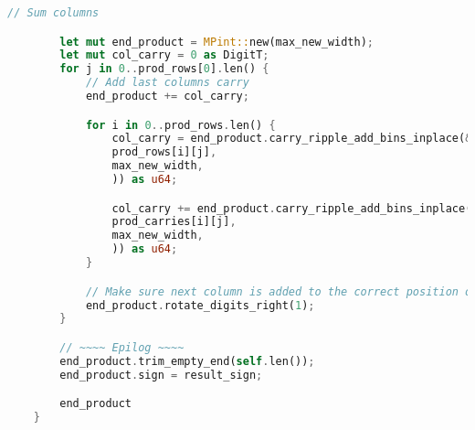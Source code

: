 \begin{lstlisting}[language=Rust, style=boxed]
        // Sum columns

        let mut end_product = MPint::new(max_new_width);
        let mut col_carry = 0 as DigitT;
        for j in 0..prod_rows[0].len() {
            // Add last columns carry
            end_product += col_carry;

            for i in 0..prod_rows.len() {
                col_carry = end_product.carry_ripple_add_bins_inplace(&MPint::from_digit(
                prod_rows[i][j],
                max_new_width,
                )) as u64;

                col_carry += end_product.carry_ripple_add_bins_inplace(&MPint::from_digit(
                prod_carries[i][j],
                max_new_width,
                )) as u64;
            }

            // Make sure next column is added to the correct position of the number system
            end_product.rotate_digits_right(1);
        }

        // ~~~~ Epilog ~~~~
        end_product.trim_empty_end(self.len());
        end_product.sign = result_sign;

        end_product
    }
\end{lstlisting}